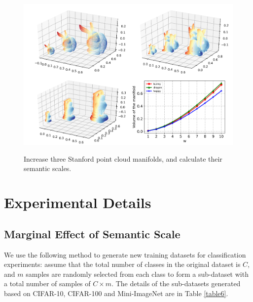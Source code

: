 \documentclass[10pt]{article} %
\begin{document}
\begin{figure}[h] %
\begin{center}
\includegraphics[width=1\columnwidth]{nfig11}
\vskip -0.03in
\caption{Increase three Stanford point cloud manifolds, and calculate their semantic scales.}
\vskip -0.03in
\label{fig11}
\end{center}
\end{figure}



\section{Experimental Details\label{Experimental Details}}

\subsection{Marginal Effect of Semantic Scale\label{B.1}}

We use the following method to generate new training datasets for classification experiments: assume that the total number of classes in the original dataset is $C$, and $m$ samples are randomly selected from each class to form a sub-dataset with a total number of samples of $C \times m$. The details of the sub-datasets generated based on CIFAR-10, CIFAR-100 and Mini-ImageNet are in Table \ref{table6}.
\end{document}
